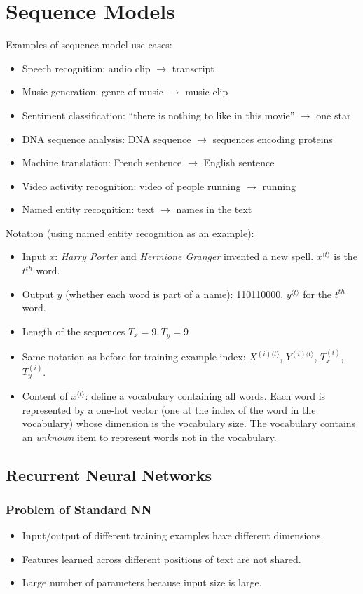 \ifx\PREAMBLE\undefined


\fi
\chapter{Sequence Models}
Examples of sequence model use cases:
\begin{itemize}
  \item Speech recognition: audio clip $\rightarrow$ transcript
  \item Music generation: genre of music $\rightarrow$ music clip
  \item Sentiment classification: ``there is nothing to like in this movie'' $\rightarrow$ one star
  \item DNA sequence analysis: DNA sequence $\rightarrow$ sequences encoding proteins
  \item Machine translation: French sentence $\rightarrow$ English sentence
  \item Video activity recognition: video of people running $\rightarrow$ running
  \item Named entity recognition: text $\rightarrow$ names in the text
\end{itemize}
Notation (using named entity recognition as an example):
\begin{itemize}
\item Input $x$: \textit{Harry Porter} and \textit{Hermione Granger} invented a new spell. $x^{\langle t\rangle}$ is the $t^{th}$ word.
\item Output $y$ (whether each word is part of a name): 110110000. $y^{\langle t\rangle}$ for the $t^{th}$ word.
\item Length of the sequences $T_x=9, T_y=9$
\item Same notation as before for training example index: $X^{(i)\langle t\rangle}$, $Y^{(i)\langle t\rangle}$, $T_x^{(i)}$, $T_y^{(i)}$.
\item Content of $x^{\langle t\rangle}$: define a vocabulary containing all words. Each word is represented by a one-hot vector (one at the index of the word in the vocabulary) whose dimension is the vocabulary size. The vocabulary contains an \textit{unknown} item to represent words not in the vocabulary.
\end{itemize}
\section{Recurrent Neural Networks}
\subsection{Problem of Standard NN}
\begin{itemize}
  \item Input/output of different training examples have different dimensions.
  \item Features learned across different positions of text are not shared.
  \item Large number of parameters because input size is large.
\end{itemize}
